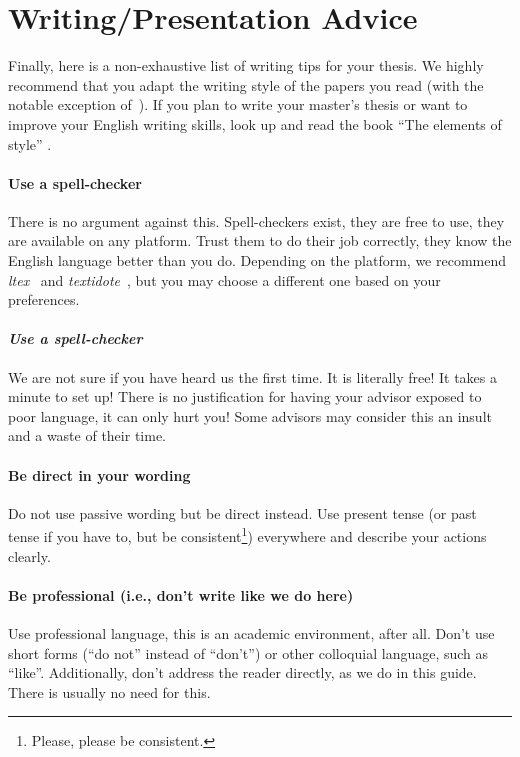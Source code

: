 \documentclass[a4paper]{article}
\begin{document}
\section{Writing/Presentation Advice}
\label{sec:writing}

Finally, here is a non-exhaustive list of writing tips for your thesis.
We highly recommend that you adapt the writing style of the papers you read (with the notable exception of~\cite{lamport1998part}).
If you plan to write your master's thesis or want to improve your English writing skills, look up and read the book ``The elements of style'' \cite{strunkelements}.


\paragraph{Use a spell-checker}
There is no argument against this.
Spell-checkers exist, they are free to use, they are available on any platform.
Trust them to do their job correctly, they know the English language better than you do.
Depending on the platform, we recommend \emph{ltex}~\cite{ltex} and \emph{textidote}~\cite{textidote}, but you may choose a different one based on your preferences.

\paragraph{\textit{Use a spell-checker}}
We are not sure if you have heard us the first time.
It is literally free!
It takes a minute to set up!
There is no justification for having your advisor exposed to poor language, it can only hurt you!
Some advisors may consider this an insult and a waste of their time.

\paragraph{Be direct in your wording}
Do not use passive wording but be direct instead.
Use present tense (or past tense if you have to, but be consistent\footnote{Please, please be consistent.}) everywhere and describe your actions clearly.

\paragraph{Be professional (i.e., don't write like we do here)}
Use professional language, this is an academic environment, after all.
Don't use short forms (``do not'' instead of ``don't'') or other colloquial language, such as ``like''.
Additionally, don't address the reader directly, as we do in this guide.
There is usually no need for this.
\end{document}
